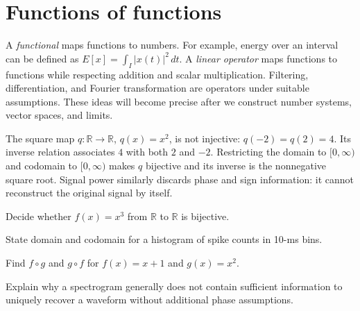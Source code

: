 \section{Functions of functions}
A \emph{functional} maps functions to numbers. For example, energy over an interval can be defined as $E[x]=\int_I |x(t)|^2\,dt$. A \emph{linear operator} maps functions to functions while respecting addition and scalar multiplication. Filtering, differentiation, and Fourier transformation are operators under suitable assumptions. These ideas will become precise after we construct number systems, vector spaces, and limits.

\begin{workedexample}
The square map $q:\mathbb R\to\mathbb R$, $q(x)=x^2$, is not injective: $q(-2)=q(2)=4$. Its inverse relation associates $4$ with both $2$ and $-2$. Restricting the domain to $[0,\infty)$ and codomain to $[0,\infty)$ makes $q$ bijective and its inverse is the nonnegative square root. Signal power similarly discards phase and sign information: it cannot reconstruct the original signal by itself.
\end{workedexample}
\begin{exercises}
\item Decide whether $f(x)=x^3$ from $\mathbb R$ to $\mathbb R$ is bijective.
\item State domain and codomain for a histogram of spike counts in 10-ms bins.
\item Find $f\circ g$ and $g\circ f$ for $f(x)=x+1$ and $g(x)=x^2$.
\item Explain why a spectrogram generally does not contain sufficient information to uniquely recover a waveform without additional phase assumptions.
\end{exercises}